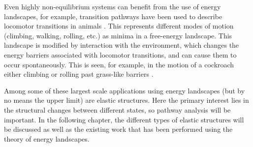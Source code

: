 Even highly non-equilibrium systems can benefit from the use of energy landscapes, for example, transition pathways have been used to describe locomotor transitions in animals \cite{Othayoth2020,Othayoth2021}.
This represents different modes of motion (climbing, walking, rolling, etc.) as minima in a free-energy landscape.
This landscape is modified by interaction with the environment, which changes the energy barriers associated with locomotor transitions, and can cause them to occur spontaneously.
This is seen, for example, in the motion of a cockroach either climbing or rolling past grass-like barriers \cite{Othayoth2020}.

Among some of these largest scale applications using energy landscapes (but by no means the upper limit) are elastic structures.
Here the primary interest lies in the structural changes between different states, so pathway analysis will be important.
In the following chapter, the different types of elastic structures will be discussed as well as the existing work that has been performed using the theory of energy landscapes.
